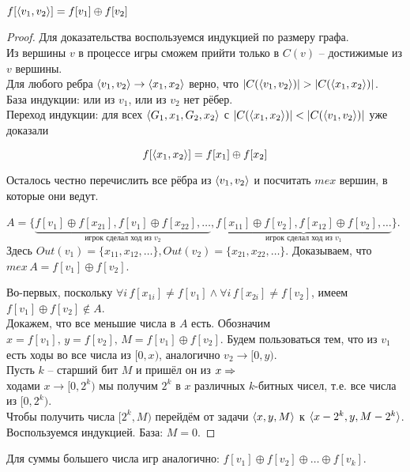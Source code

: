 \begin{Thm}
 $f[\langle v_1, v_2 \rangle] = f[v_1] \oplus f[v_2]$
\end{Thm}
\begin{proof}
Для доказательства воспользуемся индукцией по размеру графа.\\
Из вершины $v$ в процессе игры сможем прийти только в $C(v)$ -- достижимые из $v$ вершины. \\
Для любого ребра $\langle v_1, v_2 \rangle \to \langle x_1, x_2 \rangle$ верно, что $|C(\langle v_1, v_2 \rangle)| > |C(\langle x_1, x_2 \rangle)|$.\\
База индукции: или из $v_1$, или из $v_2$ нет рёбер.\\
Переход индукции: для всех $\langle G_1,x_1,G_2,x_2 \rangle$ с $|C(\langle x_1, x_2 \rangle)| < |C(\langle v_1, v_2 \rangle)|$ уже доказали 
\begin{smallformula}
$$f[\langle x_1, x_2 \rangle] = f[x_1] \oplus f[x_2]$$
\end{smallformula}
Осталось честно перечислить все рёбра из $\langle v_1, v_2 \rangle$ и посчитать $mex$ вершин, в которые они ведут.

\down
$A = \{\underbrace{f[v_1] \oplus f[x_{21}], f[v_1] \oplus f[x_{22}], \dots}_{\text{игрок сделал ход из $v_2$}}, \underbrace{f[x_{11}] \oplus f[v_2], f[x_{12}] \oplus f[v_2], \dots}_{\text{игрок сделал ход из $v_1$}}\}$. \\
Здесь $Out(v_1) = \{x_{11}, x_{12}, \dots\}, Out(v_2) = \{x_{21}, x_{22}, \dots\}$.
Доказываем, что $mex\,A = f[v_1] \oplus f[v_2]$.

\down
Во-первых, поскольку $\forall i\,f[x_{1i}] \not= f[v_1] \wedge \forall i\,f[x_{2i}] \not= f[v_2]$, имеем
$f[v_1] \oplus f[v_2] \not\in A$.\\
Докажем, что все меньшие числа в $A$ есть. Обозначим $x = f[v_1],\,y = f[v_2],\,M = f[v_1] \oplus f[v_2]$.
Будем пользоваться тем, что из $v_1$ есть ходы во все числа из $[0, x)$, аналогично $v_2 \to [0, y)$.\\
Пусть $k$ -- старший бит $M$ и пришёл он из $x \Rightarrow$ \\
ходами $x \to [0,2^k)$ мы получим $2^k$
в $x$ различных $k$-битных чисел, т.е. все числа из $[0,2^k)$. \\
Чтобы получить числа $[2^k,M)$ перейдём от задачи $\langle x, y, M \rangle$ к $\langle x - 2^k, y, M - 2^k \rangle$. \\
Воспользуемся индукцией. База: $M = 0$.
\end{proof}

\begin{Cons}
Для суммы большего числа игр аналогично: $f[v_1] \oplus f[v_2] \oplus \dots \oplus f[v_k]$.
\end{Cons}


